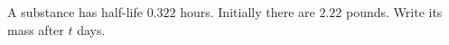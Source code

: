 A substance has half-life $0.322$ hours. Initially there are $2.22$ pounds. Write its mass after $t$ days.
